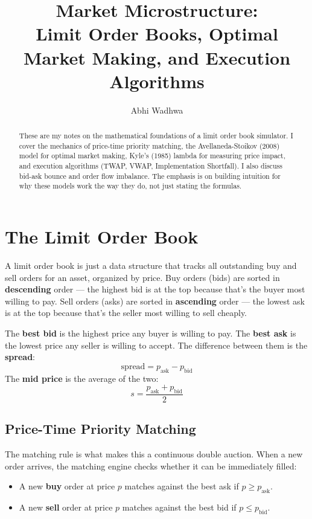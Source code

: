 \documentclass[11pt]{article}
\title{Market Microstructure:\\Limit Order Books, Optimal Market Making, and Execution Algorithms}
\author{Abhi Wadhwa}
\date{}
\begin{document}
\maketitle

\begin{abstract}
These are my notes on the mathematical foundations of a limit order book simulator. I cover the mechanics of price-time priority matching, the Avellaneda-Stoikov (2008) model for optimal market making, Kyle's (1985) lambda for measuring price impact, and execution algorithms (TWAP, VWAP, Implementation Shortfall). I also discuss bid-ask bounce and order flow imbalance. The emphasis is on building intuition for why these models work the way they do, not just stating the formulas.
\end{abstract}

\section{The Limit Order Book}

A limit order book is just a data structure that tracks all outstanding buy and sell orders for an asset, organized by price. Buy orders (bids) are sorted in \textbf{descending} order --- the highest bid is at the top because that's the buyer most willing to pay. Sell orders (asks) are sorted in \textbf{ascending} order --- the lowest ask is at the top because that's the seller most willing to sell cheaply.

The \textbf{best bid} is the highest price any buyer is willing to pay. The \textbf{best ask} is the lowest price any seller is willing to accept. The difference between them is the \textbf{spread}:
\[
    \text{spread} = p_{\text{ask}} - p_{\text{bid}}
\]
The \textbf{mid price} is the average of the two:
\[
    s = \frac{p_{\text{ask}} + p_{\text{bid}}}{2}
\]

\subsection{Price-Time Priority Matching}

The matching rule is what makes this a continuous double auction. When a new order arrives, the matching engine checks whether it can be immediately filled:

\begin{itemize}
    \item A new \textbf{buy} order at price $p$ matches against the best ask if $p \geq p_{\text{ask}}$.
    \item A new \textbf{sell} order at price $p$ matches against the best bid if $p \leq p_{\text{bid}}$.
\end{itemize}
\end{document}
